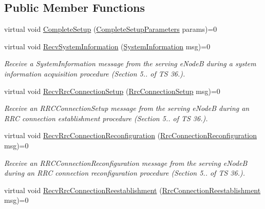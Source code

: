 \subsection*{Public Member Functions}
\begin{DoxyCompactItemize}
\item 
virtual void \hyperlink{classns3_1_1LteUeRrcSapProvider_a4c1f8cda8a1fcf1f509fa21770da682d}{Complete\+Setup} (\hyperlink{structns3_1_1LteUeRrcSapProvider_1_1CompleteSetupParameters}{Complete\+Setup\+Parameters} params)=0
\item 
virtual void \hyperlink{classns3_1_1LteUeRrcSapProvider_a34d16c5adabf7ee0caf111fd2b6bfbd3}{Recv\+System\+Information} (\hyperlink{structns3_1_1LteRrcSap_1_1SystemInformation}{System\+Information} msg)=0
\begin{DoxyCompactList}\small\item\em Receive a {\itshape System\+Information} message from the serving e\+NodeB during a system information acquisition procedure (Section 5.. of TS 36.). \end{DoxyCompactList}\item 
virtual void \hyperlink{classns3_1_1LteUeRrcSapProvider_aad40c881f56b67a46fed66e19e7e6ab0}{Recv\+Rrc\+Connection\+Setup} (\hyperlink{structns3_1_1LteRrcSap_1_1RrcConnectionSetup}{Rrc\+Connection\+Setup} msg)=0
\begin{DoxyCompactList}\small\item\em Receive an {\itshape R\+R\+C\+Connection\+Setup} message from the serving e\+NodeB during an R\+RC connection establishment procedure (Section 5.. of TS 36.). \end{DoxyCompactList}\item 
virtual void \hyperlink{classns3_1_1LteUeRrcSapProvider_a16f321a91134b1597bcf3a9e85eba39d}{Recv\+Rrc\+Connection\+Reconfiguration} (\hyperlink{structns3_1_1LteRrcSap_1_1RrcConnectionReconfiguration}{Rrc\+Connection\+Reconfiguration} msg)=0
\begin{DoxyCompactList}\small\item\em Receive an {\itshape R\+R\+C\+Connection\+Reconfiguration} message from the serving e\+NodeB during an R\+RC connection reconfiguration procedure (Section 5.. of TS 36.). \end{DoxyCompactList}\item 
virtual void \hyperlink{classns3_1_1LteUeRrcSapProvider_ad9a7cb57c2dda4aade5d2a6a1f36c414}{Recv\+Rrc\+Connection\+Reestablishment} (\hyperlink{structns3_1_1LteRrcSap_1_1RrcConnectionReestablishment}{Rrc\+Connection\+Reestablishment} msg)=0

\end{DoxyCompactItemize}

